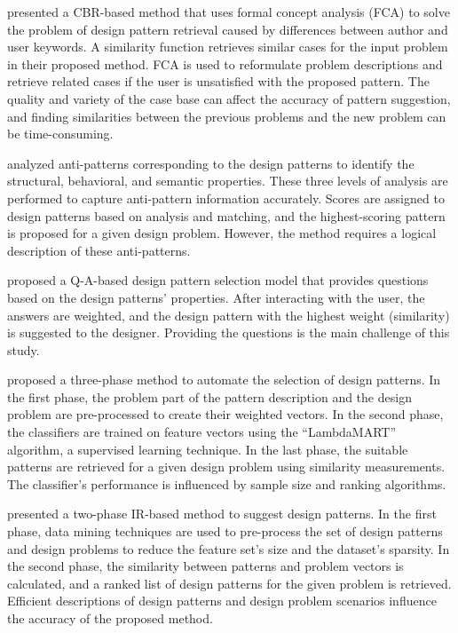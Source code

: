 \textcite{Muangon2013} presented a CBR-based method that uses formal concept analysis (FCA) to solve the problem of design pattern retrieval caused by differences between author and user keywords. A similarity function retrieves similar cases for the input problem in their proposed method. FCA is used to reformulate problem descriptions and retrieve related cases if the user is unsatisfied with the proposed pattern. The quality and variety of the case base can affect the accuracy of pattern suggestion, and finding similarities between the previous problems and the new problem can be time-consuming.

\textcite{Nahar2016} analyzed anti-patterns corresponding to the design patterns to identify the structural, behavioral, and semantic properties. These three levels of analysis are performed to capture anti-pattern information accurately. Scores are assigned to design patterns based on analysis and matching, and the highest-scoring pattern is proposed for a given design problem. However, the method requires a logical description of these anti-patterns.

\textcite{Qureshi2017} proposed a Q-A-based design pattern selection model that provides questions based on the design patterns' properties. After interacting with the user, the answers are weighted, and the design pattern with the highest weight (similarity) is suggested to the designer. Providing the questions is the main challenge of this study.

\textcite{Hussain2017software} proposed a three-phase method to automate the selection of design patterns. In the first phase, the problem part of the pattern description and the design problem are pre-processed to create their weighted vectors. In the second phase, the classifiers are trained on feature vectors using the ``LambdaMART'' algorithm, a supervised learning technique. In the last phase, the suitable patterns are retrieved for a given design problem using similarity measurements. The classifier's performance is influenced by sample size and ranking algorithms.

\textcite{Hamdy2018automatic, Hamdy2018Towards} presented a two-phase IR-based method to suggest design patterns. In the first phase, data mining techniques are used to pre-process the set of design patterns and design problems to reduce the feature set's size and the dataset's sparsity. In the second phase, the similarity between patterns and problem vectors is calculated, and a ranked list of design patterns for the given problem is retrieved. Efficient descriptions of design patterns and design problem scenarios influence the accuracy of the proposed method.

